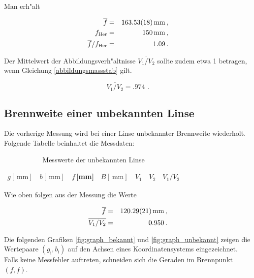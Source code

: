 		Man erh"alt

		\begin{eqnarray*}
			\overline{f} & = & \SI{163.53 (18)}{\milli \meter} \, , \\
			f_\mathrm{Her} & = & \SI{150}{\milli \meter} \, , \\
			\overline{f}/f_\mathrm{Her} & = & \SI{1.09}{} \, .
		\end{eqnarray*}

		Der Mittelwert der Abbildungsverh"altnisse $\overline{V_1/V_2}$ sollte zudem etwa 1 betragen, wenn Gleichung \eqref{abbildungsmassstab} gilt.

		\begin{equation*}
			\overline{V_1/V_2} = \SI{.974}{} \, .
		\end{equation*}

	\clearpage

	\subsection{Brennweite einer unbekannten Linse}
		\label{subsec:unbekannte}
		Die vorherige Messung wird bei einer Linse unbekannter Brennweite wiederholt.
		Folgende Tabelle beinhaltet die Messdaten:

		\begin{table}[!h]
			\begin{center}
				\label{tabelle:unbekannt}
				\caption{Messwerte der unbekannten Linse}
				\begin{tabular}{|c|c|c|c|c|c|c|}
					\hline 
					$g [\SI{}{\milli \meter}]$ & $b [\SI{}{\milli \meter}]$ & $f$\,[mm] & $B [\SI{}{\milli \meter}]$ & $V_1$ & $V_2$ & $V_1/V_2$ \\
					\hline 
					\hline
					
					\hline 
				\end{tabular}
			\end{center}
		\end{table}

		Wie oben folgen aus der Messung die Werte

		\begin{eqnarray*}
			\overline{f} & = & \SI{120.29 (21)}{\milli \meter} \, , \\
			\overline{V_1/V_2} & = & \SI{.950}{} \, .
		\end{eqnarray*}

		Die folgenden Grafiken \ref{fig:graph_bekannt} und \ref{fig:graph_unbekannt} zeigen die Wertepaare $(g_\mathrm{i}, b_\mathrm{i})$ auf den Achsen eines Koordinatensystems eingezeichnet.
		Falls keine Messfehler auftreten, schneiden sich die Geraden im Brennpunkt $(f, f)$.


